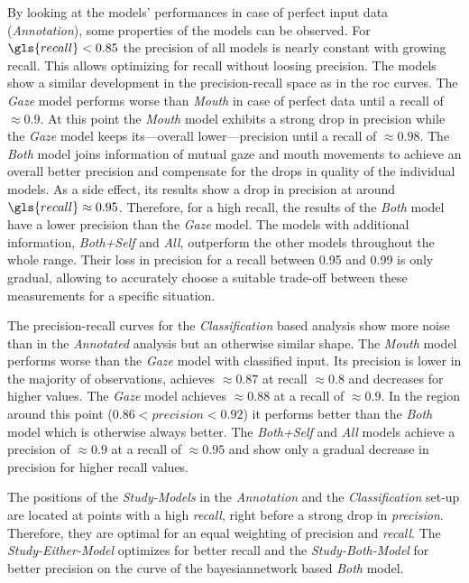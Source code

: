 By looking at the models' performances in case of perfect input data (\emph{Annotation}), some properties of the models can be observed.
For \(\gls{recall} < 0.85\) the \gls{precision} of all models is nearly constant with growing \gls{recall}.
This allows optimizing for \gls{recall} without loosing \gls{precision}.
The models show a similar development in the \gls{precision}-\gls{recall} space as in the \gls{roc} curves.
The \emph{Gaze} model performs worse than \emph{Mouth} in case of perfect data until a \gls{recall} of \(\approx 0.9\).
At this point the \emph{Mouth} model exhibits a strong drop in \gls{precision} while the \emph{Gaze} model keeps its---overall lower---precision until a \gls{recall} of \(\approx 0.98\).
The \emph{Both} model joins information of mutual gaze and mouth movements to achieve an overall better precision and compensate for the drops in quality of the individual models.
As a side effect, its results show a drop in \gls{precision} at around \(\gls{recall} \approx 0.95\).
Therefore, for a high \gls{recall}, the results of the \emph{Both} model have a lower \gls{precision} than the \emph{Gaze} model.
The models with additional information, \emph{Both+Self} and \emph{All}, outperform the other models throughout the whole range.
Their loss in \gls{precision} for a \gls{recall} between 0.95 and 0.99 is only gradual, allowing to accurately choose a suitable trade-off between these measurements for a specific situation.

The \gls{precision}-\gls{recall} curves for the \emph{Classification} based analysis show more noise than in the \emph{Annotated} analysis but an otherwise similar shape.
The \emph{Mouth} model performs worse than the \emph{Gaze} model with classified input.
Its \gls{precision} is lower in the majority of observations, achieves \(\approx 0.87\) at \gls{recall} \(\approx 0.8\) and decreases for higher values.
The \emph{Gaze} model achieves \(\approx 0.88\) at a recall of \(\approx 0.9\).
In the region around this point (\(0.86 < precision < 0.92\)) it performs better than the \emph{Both} model which is otherwise always better.
The \emph{Both+Self} and \emph{All} models achieve a \gls{precision} of \(\approx 0.9\) at a \gls{recall} of \(\approx 0.95\) and show only a gradual decrease in \gls{precision} for higher \gls{recall} values.

The positions of the \emph{Study-Models} in the \emph{Annotation} and the \emph{Classification} set-up are located at points with a high \emph{recall}, right before a strong drop in \emph{precision}.
Therefore, they are optimal for an equal weighting of \gls{precision} and \emph{recall}.
The \emph{Study-Either-Model} optimizes for better \gls{recall} and the \emph{Study-Both-Model} for better \gls{precision} on the curve of the \gls{bayesiannetwork} based \emph{Both} model.


